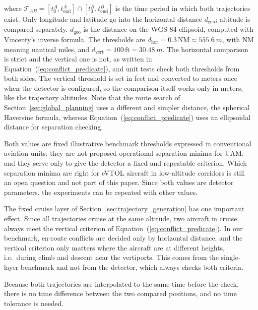 where \(\mathcal{T}_{AB} = [t^{A}_{0}, t^{A}_{\mathrm{end}}] \cap [t^{B}_{0}, t^{B}_{\mathrm{end}}]\) is the time period in which both trajectories exist. Only longitude and latitude go into the horizontal distance \(d_{\mathrm{geo}}\); altitude is compared separately. \(d_{\mathrm{geo}}\) is the distance on the WGS-84 ellipsoid, computed with Vincenty's inverse formula. The thresholds are \(d_{\mathrm{hor}} = 0.3\,\mathrm{NM} \approx \SI{555.6}{m}\), with NM meaning nautical miles, and \(d_{\mathrm{vert}} = 100\,\mathrm{ft} = \SI{30.48}{m}\). The horizontal comparison is strict and the vertical one is not, as written in Equation~(\ref{eq:conflict_predicate}), and unit tests check both thresholds from both sides. The vertical threshold is set in feet and converted to meters once when the detector is configured, so the comparison itself works only in meters, like the trajectory altitudes. Note that the route search of Section~\ref{sec:global_planning} uses a different and simpler distance, the spherical Haversine formula, whereas Equation~(\ref{eq:conflict_predicate}) uses an ellipsoidal distance for separation checking.

Both values are fixed illustrative benchmark thresholds expressed in conventional aviation units; they are not proposed operational separation minima for UAM, and they serve only to give the detector a fixed and repeatable criterion. Which separation minima are right for eVTOL aircraft in low-altitude corridors is still an open question and not part of this paper. Since both values are detector parameters, the experiments can be repeated with other values.

The fixed cruise layer of Section~\ref{sec:trajectory_generation} has one important effect. Since all trajectories cruise at the same altitude, two aircraft in cruise always meet the vertical criterion of Equation~(\ref{eq:conflict_predicate}). In our benchmark, en-route conflicts are decided only by horizontal distance, and the vertical criterion only matters where the aircraft are at different heights, i.e.\ during climb and descent near the vertiports. This comes from the single-layer benchmark and not from the detector, which always checks both criteria.

Because both trajectories are interpolated to the same time before the check, there is no time difference between the two compared positions, and no time tolerance is needed.

